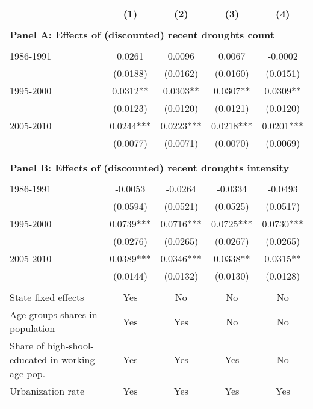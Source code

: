 \begin{tabular}{rcccc}
\toprule
      & \multirow{2}[2]{*}{\textbf{(1)}} & \multirow{2}[2]{*}{\textbf{(2)}} & \multirow{2}[2]{*}{\textbf{(3)}} & \multirow{2}[2]{*}{\textbf{(4)}} \\
      &       &       &       &  \\
\cmidrule{2-5}      &       &       &       &  \\
\multicolumn{5}{l}{\textbf{Panel A: Effects of (discounted) recent droughts count}} \\
      &       &       &       &  \\
\multicolumn{1}{l}{     1986-1991} & 0.0261 & 0.0096 & 0.0067 & -0.0002 \\
      & (0.0188) & (0.0162) & (0.0160) & (0.0151) \\
\multicolumn{1}{l}{     1995-2000} & 0.0312** & 0.0303** & 0.0307** & 0.0309** \\
      & (0.0123) & (0.0120) & (0.0121) & (0.0120) \\
\multicolumn{1}{l}{     2005-2010} & 0.0244*** & 0.0223*** & 0.0218*** & 0.0201*** \\
      & (0.0077) & (0.0071) & (0.0070) & (0.0069) \\
      &       &       &       &  \\
      &       &       &       &  \\
\multicolumn{5}{l}{\textbf{Panel B: Effects of (discounted) recent droughts intensity}} \\
      &       &       &       &  \\
\multicolumn{1}{l}{     1986-1991} & -0.0053 & -0.0264 & -0.0334 & -0.0493 \\
      & (0.0594) & (0.0521) & (0.0525) & (0.0517) \\
\multicolumn{1}{l}{     1995-2000} & 0.0739*** & 0.0716*** & 0.0725*** & 0.0730*** \\
      & (0.0276) & (0.0265) & (0.0267) & (0.0265) \\
\multicolumn{1}{l}{     2005-2010} & 0.0389*** & 0.0346*** & 0.0338** & 0.0315** \\
      & (0.0144) & (0.0132) & (0.0130) & (0.0128) \\
      &       &       &       &  \\
\multicolumn{1}{l}{State fixed effects} & Yes   & No    & No    & No \\
\multicolumn{1}{l}{Age-groups shares in population} & Yes   & Yes   & No    & No \\
\multicolumn{1}{l}{Share of high-shool-educated in working-age pop.} & Yes   & Yes   & Yes   & No \\
\multicolumn{1}{l}{Urbanization rate} & Yes   & Yes   & Yes   & Yes \\
      &       &       &       &  \\
\bottomrule
\end{tabular}%
